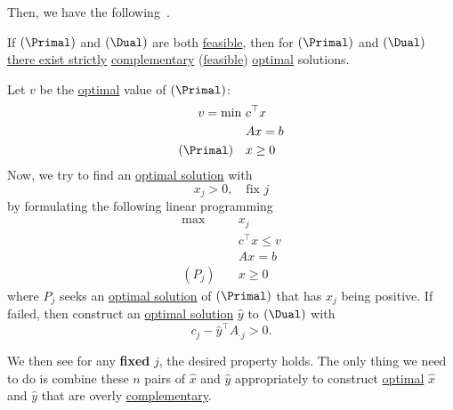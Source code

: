 Then, we have the following~\cite[Exercise 5.5]{Linear-Opt}.

\begin{theorem}\label{thm:strictly-complementarity}
	If \((\Primal)\) and \((\Dual)\) are both \hyperref[def:feasible-solution]{feasible}, then for \((\Primal)\) and \((\Dual)\) \underline{there exist strictly}
	\hyperref[def:complementary]{complementary} (\hyperref[def:feasible-solution]{feasible}) \hyperref[def:optimal-solution]{optimal} solutions.
\end{theorem}

\begin{intuition}
	Let \(v\) be the \hyperref[def:optimal-solution]{optimal} value of \((\Primal)\)\(\colon\)
	\[
		\begin{aligned}
			v = \min~      & c^{\top}x \\
			               & Ax = b    \\
			(\Primal)\quad & x\geq 0
		\end{aligned}
	\]
	Now, we try to find an \hyperref[def:optimal-solution]{optimal solution} with
	\[
		x_{j}>0, \quad \text{fix }j
	\]
	by formulating the following linear programming
	\[
		\begin{aligned}
			\max~      & x_{j}           \\
			           & c^{\top}x\leq v \\
			           & Ax = b          \\
			(P_j)\quad & x\geq  0
		\end{aligned}
	\]
	where \(P_{j}\) seeks an \hyperref[def:optimal-solution]{optimal solution} of \((\Primal)\) that has \(x_{j}\) being positive.
	If failed, then construct an \hyperref[def:optimal-solution]{optimal solution} \(\hat{y}\) to \((\Dual)\) with
	\[
		c_{j} - \hat{y}^{\top} A_{\cdot j}>0.
	\]

	We then see for any \textbf{fixed} \(j\), the desired property holds. The only thing we need to do is combine these \(n\) pairs of \(\hat{x}\) and \(\hat{y}\)
	appropriately to construct \hyperref[def:optimal-solution]{optimal} \(\hat{x}\) and \(\hat{y}\) that are overly \hyperref[def:complementary]{complementary}.
\end{intuition}
